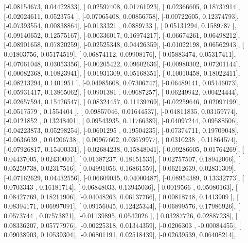\documentclass{article}
\begin{document}
       [-0.08154673,  0.04422833],
       [ 0.02597408,  0.01761923],
       [ 0.02366605,  0.18737914],
       [-0.02024611,  0.0523754 ],
       [-0.07065408,  0.00856758],
       [-0.00722605,  0.12374793],
       [-0.07393554,  0.00838864],
       [-0.0133321 ,  0.0889733 ],
       [ 0.05131294,  0.1589787 ],
       [-0.09140652,  0.12575167],
       [-0.00336017,  0.16974217],
       [-0.06674261,  0.06498212],
       [-0.08901658,  0.07820259],
       [-0.02525348,  0.04426359],
       [-0.01022198,  0.06562943],
       [ 0.01803756,  0.05174519],
       [ 0.06874112,  0.09908176],
       [ 0.05883474,  0.05317411],
       [-0.07061048,  0.03053356],
       [-0.00205422,  0.09602636],
       [-0.00980302,  0.07201144],
       [-0.00082368,  0.10823941],
       [ 0.01931309,  0.05168351],
       [ 0.10010458,  0.18022411],
       [-0.08213294,  0.1401951 ],
       [-0.04985608,  0.07306747],
       [-0.06489141,  0.05146073],
       [-0.05931417,  0.13865062],
       [ 0.0901381 ,  0.09687257],
       [ 0.06249942,  0.00424444],
       [-0.02657594,  0.15426547],
       [ 0.08324457,  0.11139769],
       [-0.02259646,  0.02097199],
       [-0.0517579 ,  0.1554404 ],
       [ 0.09857046,  0.01644537],
       [-0.04811835,  0.03159774],
       [-0.0121852 ,  0.13248401],
       [ 0.09543935,  0.11766389],
       [-0.04097244,  0.09588506],
       [-0.04223873,  0.05298254],
       [-0.0601295 ,  0.19504235],
       [-0.07374711,  0.19709048],
       [-0.0636639 ,  0.04206738],
       [ 0.00967602,  0.03679977],
       [ 0.0310238 ,  0.11864574],
       [-0.07926817,  0.15400331],
       [-0.02684238,  0.15848041],
       [-0.09286605,  0.01764269],
       [ 0.04437005,  0.02430001],
       [ 0.01387237,  0.18151535],
       [ 0.02757507,  0.18942066],
       [ 0.05259738,  0.02317516],
       [-0.04991056,  0.16861559],
       [ 0.06212639,  0.02831309],
       [-0.07162629,  0.04432556],
       [-0.06609035,  0.04000487],
       [-0.08954389,  0.13332773],
       [ 0.0703343 ,  0.16181714],
       [ 0.06848033,  0.13945036],
       [ 0.0019566 ,  0.05080163],
       [ 0.08427769,  0.18211906],
       [-0.04048263,  0.06137766],
       [ 0.00818748,  0.1413909 ],
       [ 0.08394171,  0.06997091],
       [ 0.09156045,  0.12425344],
       [-0.06899576,  0.17986926],
       [ 0.0573744 ,  0.07573821],
       [-0.01139895,  0.0542026 ],
       [ 0.03287726,  0.02887238],
       [ 0.08336207,  0.05777976],
       [-0.00225318,  0.01344359],
       [-0.0206303 , -0.00084455],
       [ 0.09038903,  0.10539304],
       [-0.06801191,  0.02518439],
       [-0.02639539,  0.06408214],
\end{document}
